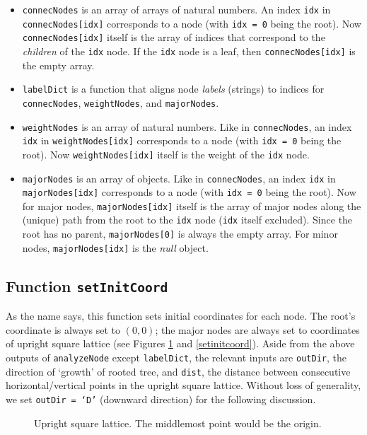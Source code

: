 \documentclass{article}
\theoremstyle{plain}
\theoremstyle{remark}
\begin{document}
\begin{itemize}
	\item \texttt{connecNodes} is an array of arrays of natural numbers. An index \texttt{idx} in \texttt{connecNodes[idx]} corresponds to a node (with \texttt{idx = 0} being the root). Now \texttt{connecNodes[idx]} itself is the array of indices that correspond to the \textit{children} of the \texttt{idx} node. If the \texttt{idx} node is a leaf, then \texttt{connecNodes[idx]} is the empty array.
	\item \texttt{labelDict} is a function that aligns node \textit{labels} (strings) to indices for \texttt{connecNodes}, \texttt{weightNodes}, and \texttt{majorNodes}.
	\item \texttt{weightNodes} is an array of natural numbers. Like in \texttt{connecNodes}, an index \texttt{idx} in \texttt{weightNodes[idx]} corresponds to a node (with \texttt{idx = 0} being the root). Now \texttt{weightNodes[idx]} itself is the weight of the \texttt{idx} node.
	\item \texttt{majorNodes} is an array of objects. Like in \texttt{connecNodes}, an index \texttt{idx} in \texttt{majorNodes[idx]} corresponds to a node (with \texttt{idx = 0} being the root). Now for major nodes, \texttt{majorNodes[idx]} itself is the array of major nodes along the (unique) path from the root to the \texttt{idx} node (\texttt{idx} itself excluded). Since the root has no parent, \texttt{majorNodes[0]} is always the empty array. For minor nodes, \texttt{majorNodes[idx]} is the \textit{null} object.
\end{itemize}

\subsection{Function \texttt{setInitCoord}}
As the name says, this function sets initial coordinates for each node. The root's coordinate is always set to $(0,0)$; the major nodes are always set to coordinates of upright square lattice (see Figures \ref{lattice} and \ref{setinitcoord}). Aside from the above outputs of \texttt{analyzeNode} except \texttt{labelDict}, the relevant inputs are \texttt{outDir}, the direction of `growth' of rooted tree, and \texttt{dist}, the distance between consecutive horizontal/vertical points in the upright square lattice. Without loss of generality, we set \texttt{outDir = `D'} (downward direction) for the following discussion.

\begin{figure}[htbp]
	\centering
	\caption{Upright square lattice. The middlemost point would be the origin.}
	\label{lattice}
\end{figure}
\end{document}
